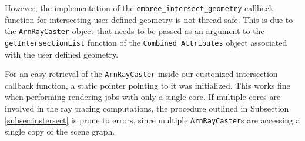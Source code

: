 However, the implementation of the \texttt{embree\_intersect\_geometry} callback function for intersecting user defined geometry is not thread safe. This is due to the \texttt{ArnRayCaster} object that needs to be passed as an argument to the \texttt{getIntersectionList} function of the \texttt{Combined Attributes} object associated with the user defined geometry.

For an easy retrieval of the \texttt{ArnRayCaster} inside our custonized intersection callback function, a static pointer pointing to it was initialized. This works fine when performing rendering jobs with only a single core. If multiple cores are involved in the ray tracing computations, the procedure outlined in Subsection \ref{subsec:instersect} is prone to errors, since multiple \texttt{ArnRayCaster}s are accessing a single copy of the scene graph. 

